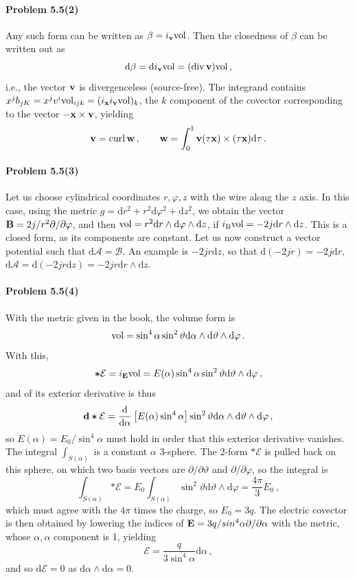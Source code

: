 \documentclass[a4paper,12pt]{article}
\def\d{\mathrm{d}}
\newcommand{\problem}[1]{\paragraph{Problem #1}}
\begin{document}

\problem{5.5(2)} Any such form can be written as $\beta=i_{\bf v}{\rm vol}$. Then the closedness of $\beta$ can be written out as
\[
 \d \beta = \d i_{\bf v} {\rm vol} = (\mathop{\rm div}{\bf v}){\rm vol}\,,
\]
i.e., the vector ${\bf v}$ is divergenceless (source-free).
The integrand contains $x^j b_{jK} = x^j v^i{\rm vol}_{ijk}=(i_{\bf x}i_{\bf v}{\rm vol})_k$, the $k$ component of the covector corresponding to the vector $-{\bf x}\times {\bf v}$, yielding
\[
 {\bf v}=\mathop{\rm curl}{\bf w}\,,\quad\quad
 {\bf w} = \int_0^1 {\bf v}(\tau{\bf x})\times(\tau {\bf x})\d \tau\,.
\]


\problem{5.5(3)} Let us choose cylindrical coordinates $r,\varphi, z$ with the wire along the $z$ axis. In this case, using the metric $g=\d r^2 + r^2\d\varphi^2 + \d z^2$, we obtain the vector ${\bf B} = 2j/r^2 \partial/\partial\varphi$, and then ${\rm vol} = r^2 \d r \wedge \d\varphi \wedge \d z$, if $i_{\rm B}{\rm vol}= -2 j \d r\wedge \d z$. This is a closed form, as its components are constant. Let us now construct a vector potential such that $\d\mathcal{A} = \mathcal{B}$. An example is $-2jr\d z$, so that $\d(-2 j r)=-2 j \d r$, $\d\mathcal{A}=\d(-2jr\d z) = -2j r\d r\wedge \d z$.


\problem{5.5(4)} With the metric given in the book, the volume form is
\[
 {\rm vol} = \sin^4\alpha\sin^2\vartheta \d\alpha\wedge\d\vartheta\wedge\d\varphi\,.
\]
With this,
\[
 \boldsymbol{*}\mathcal{E} = i_{\bf E}{\rm vol} = E(\alpha)\sin^4\alpha\sin^2\vartheta\d\vartheta\wedge\d\varphi\,,
\]
and of its exterior derivative is thus
\[
 {\bf d}\boldsymbol{*}\mathcal{E}=\frac{\d}{\d\alpha}\left[E(\alpha)\sin^4\alpha\right]\sin^2\vartheta\d\alpha\wedge\d\vartheta\wedge\d\varphi\,,
\]
so $E(\alpha)=E_0/\sin^4\alpha$ must hold in order that this exterior derivative vanishes.  The integral $\int_{S(\alpha)}$ is a constant $\alpha$ 3-sphere.  The 2-form $\boldsymbol{*}\mathcal{E}$ is pulled back on this sphere, on which two basis vectors are $\partial/\partial\vartheta$ and $\partial/\partial\varphi$, so the integral is
\[
 \int_{S(\alpha)}\boldsymbol{*}\mathcal{E} = E_0\int_{S(\alpha)}\sin^2\vartheta\d\vartheta\wedge\d\varphi= \frac{4\pi}{3}E_0\,,
\]
which must agree with the $4\pi$ times the charge, so
$E_0 = 3q$. The electric covector is then obtained by lowering the indices of ${\bf E} = 3q/sin^4\alpha \partial/\partial\alpha$ with the metric, whose $\alpha,\alpha$ component is 1, yielding
\[
 \mathcal{E} = \frac{q}{3\sin^4\alpha}\d\alpha\,,
\]
and so $\d\mathcal{E}=0$ as $\d\alpha\wedge\d\alpha=0$.
\end{document}
